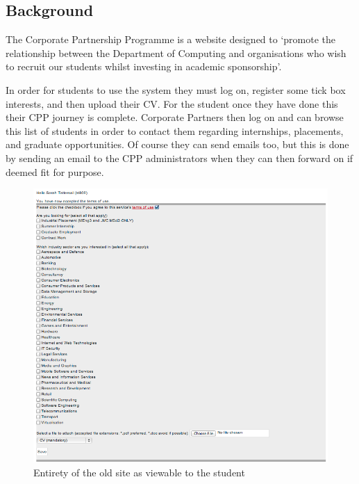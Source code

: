 \subsection{Background}
The Corporate Partnership Programme is a website designed to `promote the relationship between the Department of Computing and organisations who wish to recruit our students whilst investing in academic sponsorship'\cite{doc-cpp}.

In order for students to use the system they must log on, register some tick box interests, and then upload their CV.
For the student once they have done this their CPP journey is complete.
Corporate Partners then log on and can browse this list of students in order to contact them regarding internships, placements, and graduate opportunities. Of course they can send emails too, but this is done by sending an email to the CPP administrators when they can then forward on if deemed fit for purpose.

\begin{figure}[H]\centering
\includegraphics[scale=0.5]{images/introduction/old_cpp}
\caption{Entirety of the old site as viewable to the student}
\end{figure}
